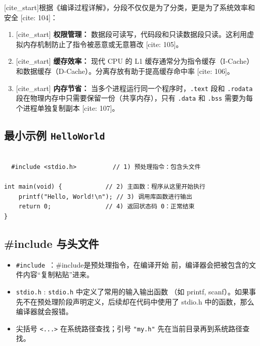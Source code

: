 [cite\_start]根据《编译过程详解》，分段不仅仅是为了分类，更是为了系统效率和安全 [cite: 104]：
\begin{enumerate}
    \item {[cite\_start]} \textbf{权限管理：} 数据段可读写，代码段和只读数据段只读。这利用虚拟内存机制防止了指令被恶意或无意篡改 [cite: 105]。
    \item {[cite\_start]} \textbf{缓存效率：} 现代 CPU 的 L1 缓存通常分为指令缓存（I-Cache）和数据缓存（D-Cache）。分离存放有助于提高缓存命中率 [cite: 106]。
    \item {[cite\_start]} \textbf{内存节省：} 当多个进程运行同一个程序时，\texttt{.text} 段和 \texttt{.rodata} 段在物理内存中只需要保留一份（共享内存），只有 \texttt{.data} 和 \texttt{.bss} 需要为每个进程单独复制副本 [cite: 107]。
\end{enumerate}






































\subsection{最小示例 \texttt{HelloWorld}}%
\begin{lstlisting}[caption={最小 C 程序示例},label={lst:hello}]

  #include <stdio.h>          // 1) 预处理指令：包含头文件

int main(void) {            // 2) 主函数：程序从这里开始执行
    printf("Hello, World!\n"); // 3) 调用库函数进行输出
    return 0;               // 4) 返回状态码 0：正常结束
}
\end{lstlisting}

\subsection{\#include 与头文件}
\begin{itemize}%
  \item \texttt{\#include }：\#include是预处理指令，在编译开始
  前，编译器会把被包含的文件内容“复制粘贴”进来。
  \item \texttt{stdio.h} :  \texttt{stdio.h} 中定义了常用的输入输出函数
  （如 printf, scanf）。如果事先不在预处理阶段声明定义，后续却在代码中使用了
  stdio.h 中的函数，那么编译器就会报错。
  \item 尖括号 \verb|<...>| 在系统路径查找；引号 \verb|"my.h"| 先在当前目录再到系统路径查找。
\end{itemize}

